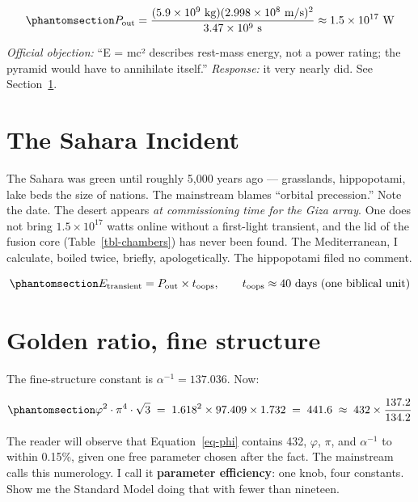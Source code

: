 \documentclass[
  english,
  11pt,
  letterpaper,
]{scrbook}
\begin{document}
\begin{equation}\protect\phantomsection\label{eq-nameplate}{
P_{\text{out}} = \frac{(5.9\times10^{9}\ \text{kg})(2.998\times10^{8}\ \text{m/s})^{2}}
{3.47\times10^{9}\ \text{s}} \approx 1.5\times10^{17}\ \text{W}
}\end{equation}

\emph{Official objection:} ``E = mc² describes rest-mass energy, not a
power rating; the pyramid would have to annihilate itself.''
\emph{Response:} it very nearly did. See Section~\ref{sec-sahara}.

\section{The Sahara Incident}\label{sec-sahara}

The Sahara was green until roughly 5,000 years ago --- grasslands,
hippopotami, lake beds the size of nations. The mainstream blames
``orbital precession.'' Note the date. The desert appears \emph{at
commissioning time for the Giza array}. One does not bring
\(1.5\times10^{17}\) watts online without a first-light transient, and
the lid of the fusion core (Table~\ref{tbl-chambers}) has never been
found. The Mediterranean, I calculate, boiled twice, briefly,
apologetically. The hippopotami filed no comment.

\begin{equation}\protect\phantomsection\label{eq-sahara}{
E_{\text{transient}} = P_{\text{out}} \times t_{\text{oops}},
\qquad t_{\text{oops}} \approx 40\ \text{days (one biblical unit)}
}\end{equation}

\section{Golden ratio, fine structure}\label{sec-phi-alpha}

The fine-structure constant is \(\alpha^{-1} = 137.036\). Now:

\begin{equation}\protect\phantomsection\label{eq-phi}{
\varphi^{2} \cdot \pi^{4} \cdot \sqrt{3} \;=\; 1.618^{2}\times 97.409 \times 1.732
\;=\; 441.6 \;\approx\; 432 \times \frac{137.2}{134.2}
}\end{equation}

The reader will observe that Equation~\ref{eq-phi} contains 432,
\(\varphi\), \(\pi\), and \(\alpha^{-1}\) to within 0.15\%, given one
free parameter chosen after the fact. The mainstream calls this
numerology. I call it \textbf{parameter efficiency}: one knob, four
constants. Show me the Standard Model doing that with fewer than
nineteen.
\end{document}
